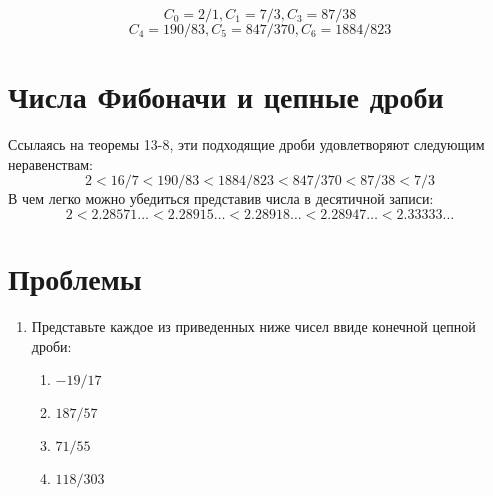 \documentclass[11pt]{article}
\begin{document}
				\[C_0=2/1,C_1=7/3,C_3=87/38\]
				\[C_4=190/83,C_5=847/370,C_6=1884/823\]
		
		
		\section{Числа Фибоначи и цепные дроби}
		Ссылаясь на теоремы 13-8, эти подходящие дроби удовлетворяют следующим неравенствам:
		$$2<16/7<190/83<1884/823<847/370<87/38<7/3$$
		В чем легко можно убедиться представив числа в десятичной записи:
		$$2<2.28571\dots<2.28915\dots<2.28918\dots<2.28947\dots<2.33333\dots$$
		
	\section{Проблемы}
\noindent
\begin{enumerate}
\item Представьте каждое из приведенных ниже чисел ввиде конечной цепной дроби:
\begin{enumerate}
\item$-19/17$  \item$187/57$  \item$71/55$  \item$118/303$
	\end{enumerate}	


\end{enumerate}
\end{document}
